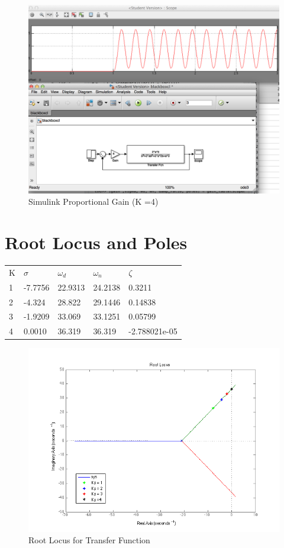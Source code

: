 \documentclass[english]{article}
\begin{document}
\begin{figure}[h!]
\includegraphics[width = \linewidth]{simulink2.png}
\caption{Simulink Proportional Gain (K =4)}
\end{figure}

\FloatBarrier
\section{Root Locus and Poles}
\begin{table}[h]
\begin{tabular}{|l|l|l|l|l|}
K & $\sigma $&$ \omega_d$ &$ \omega_n $&$ \zeta$ \\
1 & -7.7756 & 22.9313 & 24.2138 & 0.3211        \\
2 & -4.324  & 28.822  & 29.1446 & 0.14838       \\
3 & -1.9209 & 33.069  & 33.1251 & 0.05799       \\
4 & 0.0010  & 36.319  & 36.319  & -2.788021e-05
\end{tabular}
\end{table}
\begin{figure}[h!]
\includegraphics[width = \linewidth]{rlocus_kp.png}
\caption{Root Locus for Transfer Function}
\end{figure}
\FloatBarrier
\end{document}
